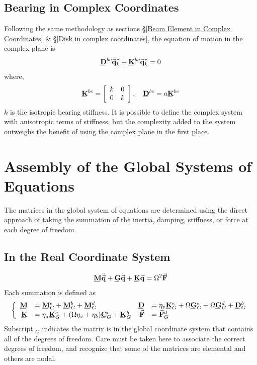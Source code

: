 \subsection{Bearing in Complex Coordinates}
Following the same methodology as sections \S\ref{Beam Element in Complex Coordinates} \& \S\ref{Disk in complex coordinates}, the equation of motion in the complex plane is
\begin{equation}\label{eq:BearingNodeEquationsofMotionComplex}
\bunderline{\mathbf{D}}^{bc}\dot{\vec{\mathbf{q}}}^c_k+\bunderline{\mathbf{K}}^{bc}\vec{\mathbf{q}}^c_k=0
\end{equation}
where,
\begin{equation*}
 \bunderline{\mathbf{K}}^{bc}=\left[\begin{array}{cc}
k&0\\
0&k
\end{array}\right],\quad
\bunderline{\mathbf{D}}^{bc}=a\bunderline{\mathbf{K}}^{bc}
\end{equation*}
$ k $ is the isotropic bearing stiffness. It is possible to define the complex system with anisotropic terms of stiffness, but the complexity added to the system outweighs the benefit of using the complex plane in the first place.
%
%
\section{Assembly of the Global Systems of Equations} \label{Assembly of the Global Systems of Equations}
The matrices in the global system of equations are determined using the direct approach of taking the summation of the inertia, damping, stiffness, or force at each degree of freedom.
\subsection{In the Real Coordinate System}
\begin{equation}\label{eq:GlobalSystemofEquationsReal}
\bunderline{\mathbf{M}}\ddot{\vec{\mathbf{q}}}+\bunderline{\mathbf{G}}\dot{\vec{\mathbf{q}}}+\bunderline{\mathbf{K}}\vec{\mathbf{q}}=\Omega^2\vec{\mathbf{F}}
\end{equation}
Each summation is defined as 
\begin{equation*}
\left\{\begin{array}{rlrl}
\bunderline{\mathbf{M}}&=\bunderline{\mathbf{M}}^e_G+\bunderline{\mathbf{M}}^b_G+\bunderline{\mathbf{M}}^d_G&\bunderline{\mathbf{D}}&=\eta_v\bunderline{\mathbf{K}}^e_G+\Omega\bunderline{\mathbf{G}}^e_G+\Omega\bunderline{\mathbf{G}}^d_G+\bunderline{\mathbf{D}}^b_G\\
\bunderline{\mathbf{K}}&=\eta_a\bunderline{\mathbf{K}}^e_G+(\Omega\eta_v+\eta_b)\bunderline{\mathbf{C}}^e_G+\bunderline{\mathbf{K}}^b_G&\vec{\mathbf{F}}&=\vec{\mathbf{F}}^d_G
\end{array}\right.
\end{equation*}
Subscript $ _G $ indicates the matrix is in the global coordinate system that contains all of the degrees of freedom. Care must be taken here to associate the correct degrees of freedom, and recognize that some of the matrices are elemental and others are nodal. 
